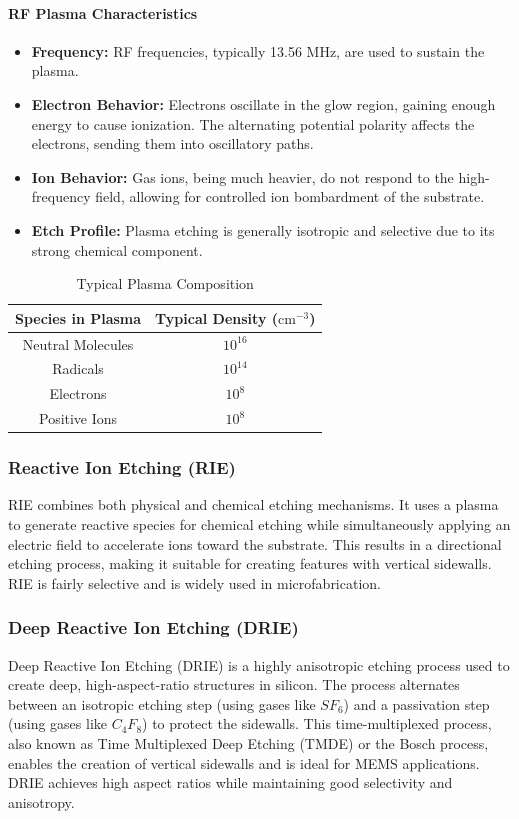 \documentclass{report}
\begin{document}
\paragraph{RF Plasma Characteristics}
\begin{itemize}
    \item \textbf{Frequency:} RF frequencies, typically 13.56 MHz, are used to sustain the plasma.
    \item \textbf{Electron Behavior:} Electrons oscillate in the glow region, gaining enough energy to cause ionization. The alternating potential polarity affects the electrons, sending them into oscillatory paths.
    \item \textbf{Ion Behavior:} Gas ions, being much heavier, do not respond to the high-frequency field, allowing for controlled ion bombardment of the substrate.
    \item \textbf{Etch Profile:} Plasma etching is generally isotropic and selective due to its strong chemical component.
\end{itemize}

\begin{table}
    \centering
    \begin{tabular}{c|c}
        \textbf{Species in Plasma} & \textbf{Typical Density ($\text{cm}^{-3}$)} \\
        \hline
        Neutral Molecules & $10^{16}$ \\
        Radicals & $10^{14}$ \\
        Electrons & $10^{8}$ \\
        Positive Ions & $10^{8}$ \\
    \end{tabular}
    \caption{Typical Plasma Composition}
\end{table}

\subsubsection{Reactive Ion Etching (RIE)}
RIE combines both physical and chemical etching mechanisms. It uses a plasma to generate reactive species for chemical etching while simultaneously applying an electric field to accelerate ions toward the substrate. This results in a directional etching process, making it suitable for creating features with vertical sidewalls. RIE is fairly selective and is widely used in microfabrication.

\subsubsection{Deep Reactive Ion Etching (DRIE)}
Deep Reactive Ion Etching (DRIE) is a highly anisotropic etching process used to create deep, high-aspect-ratio structures in silicon. The process alternates between an isotropic etching step (using gases like $SF_6$) and a passivation step (using gases like $C_4F_8$) to protect the sidewalls. This time-multiplexed process, also known as Time Multiplexed Deep Etching (TMDE) or the Bosch process, enables the creation of vertical sidewalls and is ideal for MEMS applications. DRIE achieves high aspect ratios while maintaining good selectivity and anisotropy.
\end{document}
